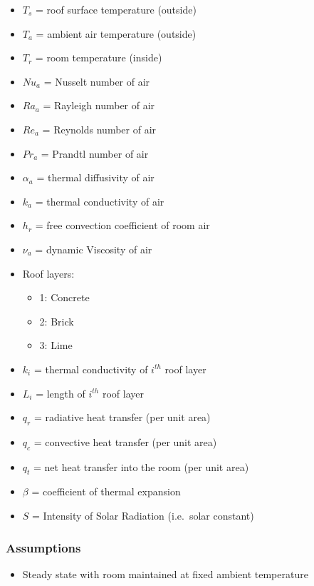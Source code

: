 \documentclass[11pt]{article}
\providecommand{\tightlist}{%
      \setlength{\itemsep}{0pt}\setlength{\parskip}{0pt}}
\begin{document}
\begin{itemize}
\tightlist
\item
  \(T_s\) = roof surface temperature (outside)
\item
  \(T_a\) = ambient air temperature (outside)
\item
  \(T_r\) = room temperature (inside)
\item
  \(Nu_a\) = Nusselt number of air
\item
  \(Ra_a\) = Rayleigh number of air
\item
  \(Re_a\) = Reynolds number of air
\item
  \(Pr_a\) = Prandtl number of air
\item
  \(\alpha_a\) = thermal diffusivity of air
\item
  \(k_a\) = thermal conductivity of air
\item
  \(h_r\) = free convection coefficient of room air
\item
  \(\nu_a\) = dynamic Viscosity of air
\item
  Roof layers:

  \begin{itemize}
  \tightlist
  \item
    1: Concrete
  \item
    2: Brick
  \item
    3: Lime
  \end{itemize}
\item
  \(k_i\) = thermal conductivity of \(i^{th}\) roof layer
\item
  \(L_i\) = length of \(i^{th}\) roof layer
\item
  \(q_{r}\) = radiative heat transfer (per unit area)
\item
  \(q_{c}\) = convective heat transfer (per unit area)
\item
  \(q_{t}\) = net heat transfer into the room (per unit area)
\item
  \(\beta\) = coefficient of thermal expansion
\item
  \(S\) = Intensity of Solar Radiation (i.e.~solar constant)
\end{itemize}

    \hypertarget{assumptions}{%
\subsubsection{Assumptions}\label{assumptions}}

\begin{itemize}
\tightlist
\item
  Steady state with room maintained at fixed ambient temperature
\end{itemize}
\end{document}
